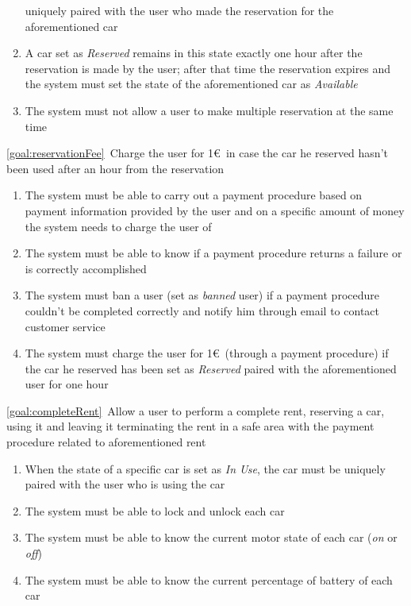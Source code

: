\begin{description}
\begin{enumerate}[resume*]
 	  			uniquely paired with the user who made the reservation for the aforementioned car
 	  			\item A car set as \emph{Reserved} remains in this state exactly one hour after the
 	  			reservation is made by the user; after that time the reservation expires and the system
 	  			must set the state of the aforementioned car as \emph{Available}
 	  			\item The system must not allow a user to make multiple reservation at the same time
   			\end{enumerate}
  		\item \ref{goal:reservationFee}\ Charge the user for 1\euro\ in case the car he reserved hasn't
  		been used after an hour from the reservation
  			\begin{enumerate}[resume*]
  				\item The system must be able to carry out a payment procedure based on payment
  				information provided by the user and on a specific amount of money the system needs
  				to charge the user of
  				\item The system must be able to know if a payment procedure returns a failure or is
  				correctly accomplished
  				\item The system must ban a user (set as \emph{banned} user) if a
  				payment procedure couldn't be completed correctly and notify him through email to
  				contact customer service
  				\item The system must charge the user for 1\euro\ (through a payment procedure) if
  				the car he reserved has been set as \emph{Reserved} paired with the aforementioned
  				user for one hour
   			\end{enumerate}
  		\item \ref{goal:completeRent}\ Allow a user to perform a complete rent, reserving a car,
  		using it and leaving it terminating the rent in a safe area with the payment procedure
  		related to aforementioned rent
  			\begin{enumerate}[resume*]
  			 	\item When the state of a specific car is set as \emph{In Use}, the car must be
 	  			uniquely paired with the user who is using the car
  				\item The system must be able to lock and unlock each car
  				\item The system must be able to know the current motor state of each car
  				(\emph{on} or \emph{off})
  				\item The system must be able to know the current percentage of battery of each car

\end{enumerate}
\end{description}
